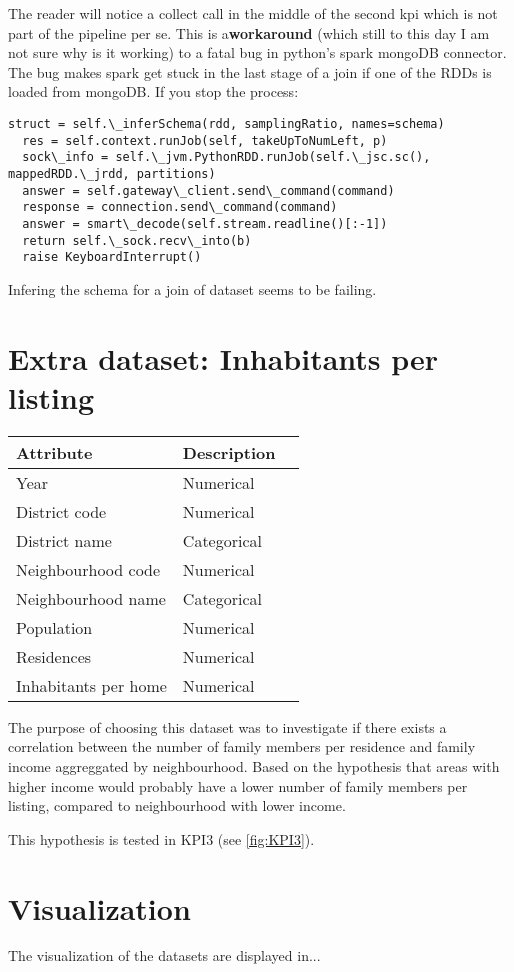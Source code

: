 \documentclass[12pt, a4paper]{article}
\begin{document}
The reader will notice a collect call in the middle of the second kpi which is not part of the pipeline per se.
This is a\textbf{workaround} (which still to this day I am not sure why is it working) to a fatal bug in python's spark mongoDB connector.
The bug makes spark get stuck in the last stage of a join if one of the RDDs is loaded from mongoDB. If you stop the process:

\begin{lstlisting}[breaklines=true]
  struct = self.\_inferSchema(rdd, samplingRatio, names=schema)
  res = self.context.runJob(self, takeUpToNumLeft, p)
  sock\_info = self.\_jvm.PythonRDD.runJob(self.\_jsc.sc(), mappedRDD.\_jrdd, partitions)
  answer = self.gateway\_client.send\_command(command)
  response = connection.send\_command(command)
  answer = smart\_decode(self.stream.readline()[:-1])
  return self.\_sock.recv\_into(b)
  raise KeyboardInterrupt()
\end{lstlisting}

Infering the schema for a join of dataset seems to be failing.

\section{Extra dataset: Inhabitants per listing}

\begin{table}[h!]
\begin{tabular}{l|l|l}
Attribute & Description \\ \hline
Year & Numerical \\
District code & Numerical \\
District name & Categorical \\
Neighbourhood code & Numerical \\
Neighbourhood name & Categorical \\
Population & Numerical \\
Residences & Numerical \\
Inhabitants per home & Numerical
\end{tabular}
\end{table}

The purpose of choosing this dataset was to investigate if there exists a correlation between the number of family members per residence and family income aggreggated by neighbourhood. Based on the hypothesis that areas with higher income would probably have a lower number of family members per listing, compared to neighbourhood with lower income.

This hypothesis is tested in KPI3 (see \ref{fig:KPI3}).

\section{Visualization}

The visualization of the datasets are displayed in...
\end{document}
